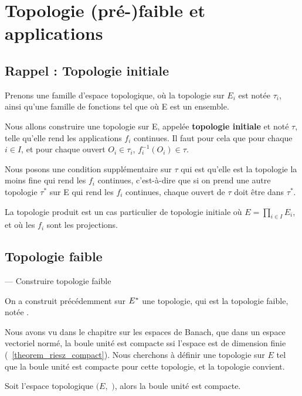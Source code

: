 \chapter{Topologie (pré-)faible et applications}

\section{Rappel : Topologie initiale}

Prenons une famille
 d'espace topologique, où la topologie sur $E_{i}$ est notée
$\tau_{i}$, ainsi qu'une famille de fonctions  tel que
 où E est un ensemble.

Nous allons construire une topologie sur E, appelée \textbf{topologie initiale}
et noté $\tau$, telle qu'elle rend les applications $f_{i}$ continues. Il faut
pour cela que pour chaque $i \in I$, et pour chaque ouvert $O_{i} \in \tau_{i}$,
$f_{i}^{-1}(O_{i}) \in \tau$.

Nous posons une condition supplémentaire sur $\tau$ qui est qu'elle est la
topologie la moins fine qui rend les $f_{i}$ continues, c'est-à-dire que si on
prend une autre topologie $\tau^{*}$ sur E qui rend les $f_{i}$ continues, chaque
ouvert de $\tau$ doit être dans $\tau^{*}$.

\begin{exemple}
	La topologie produit est un cas particulier de topologie initiale où $E =
	\displaystyle \prod_{i \in I} E_{i}$, et où les $f_{i}$ sont les projections.
\end{exemple}

\section{Topologie faible}

--- Construire topologie faible

On a construit précédemment sur $E^{*}$ une topologie, qui est la topologie
faible, notée .

Nous avons vu dans le chapitre sur les espaces de Banach, que dans un espace
vectoriel normé, la boule unité est compacte ssi l'espace est de dimension
finie (~\ref{theorem_riesz_compact}). Nous cherchons à définir une topologie sur
$E$ tel que la boule unité est compacte pour cette topologie, et la topologie
 convient.

\begin{theorem}
	Soit l'espace topologique $(E,$ $)$, alors la boule unité
	est compacte.
\end{theorem}

